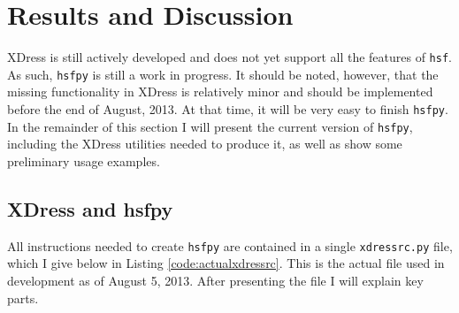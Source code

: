 
\section{Results and Discussion} \label{sec:results_and_discussion}

XDress is still actively developed and does not yet support all the features of \texttt{hsf}. As such, \texttt{hsfpy} is still a work in progress. It should be noted, however, that the missing functionality in XDress is relatively minor and should be implemented before the end of August, 2013. At that time, it will be very easy to finish \texttt{hsfpy}. In the remainder of this section I will present the current version of \texttt{hsfpy}, including the XDress utilities needed to produce it, as well as show some preliminary usage examples.

\subsection{XDress and hsfpy} \label{sub:xdress_and_hsfpy}

  All instructions needed to create \texttt{hsfpy} are contained in a single \texttt{xdressrc.py} file, which I give below in Listing \ref{code:actualxdressrc}. This is the actual file used in development as of August 5, 2013. After presenting the file I will explain key parts.

  \vspace{.2in}
  

